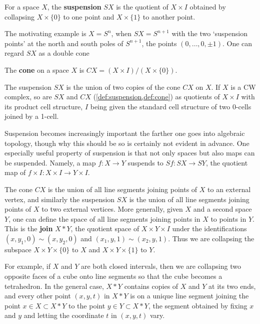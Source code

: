 \begin{definition}[Suspension]
\label{def:suspension}
For a space $X$, the \textbf{suspension} $SX$ is the quotient of $X \times I$ obtained by
collapsing $X \times \{0\}$ to one point and $X \times \{1\}$ to another point.
\end{definition}

The motivating example is $X = S^n$, when $SX = S^{n+1}$ with the two `suspension
points' at the north and south poles of $S^{n+1}$, the points $(0,\ldots,0,\pm 1)$. One can
regard $SX$ as a double cone



\begin{definition}[Cone]
\label{def:cone}
The \textbf{cone} on a space $X$ is $CX = (X \times I)/(X \times \{0\})$.
\end{definition}

The suspension $SX$ is the union of two copies of the cone $CX$ on $X$. If $X$ is a
CW complex, so are $SX$ and $CX$ (\cref{def:suspension,def:cone}) as quotients of $X \times I$
with its product cell structure, $I$ being given the standard cell structure of two 0-cells
joined by a 1-cell.

Suspension becomes increasingly important the farther one goes into algebraic
topology, though why this should be so is certainly not evident in advance. One
especially useful property of suspension is that not only spaces but also maps can be
suspended. Namely, a map $f : X \to Y$ suspends to $Sf : SX \to SY$, the quotient map
of $f \times I : X \times I \to Y \times I$.

\begin{definition}
\label{def:join}
The cone $CX$ is the union of all line segments joining points of $X$ to an external
vertex, and similarly the suspension $SX$ is the union of all line segments joining
points of $X$ to two external vertices. More generally, given $X$ and a second space
$Y$, one can define the space of all line segments joining points in $X$ to points in $Y$.
This is the \textbf{join} $X * Y$, the quotient space of $X \times Y \times I$ under the
identifications $(x,y_1,0) \sim (x,y_2,0)$ and $(x_1,y,1) \sim (x_2,y,1)$. Thus we are
collapsing the subspace $X \times Y \times \{0\}$ to $X$ and $X \times Y \times \{1\}$ to $Y$.
\end{definition}

For example, if $X$ and $Y$ are both closed intervals, then we are collapsing two
opposite faces of a cube onto line segments so that the cube becomes a tetrahedron. In
the general case, $X * Y$ contains copies of $X$ and $Y$ at its two ends, and every
other point $(x,y,t)$ in $X * Y$ is on a unique line segment joining the point
$x \in X \subset X * Y$ to the point $y \in Y \subset X * Y$, the segment obtained by fixing $x$
and $y$ and letting the coordinate $t$ in $(x,y,t)$ vary.



